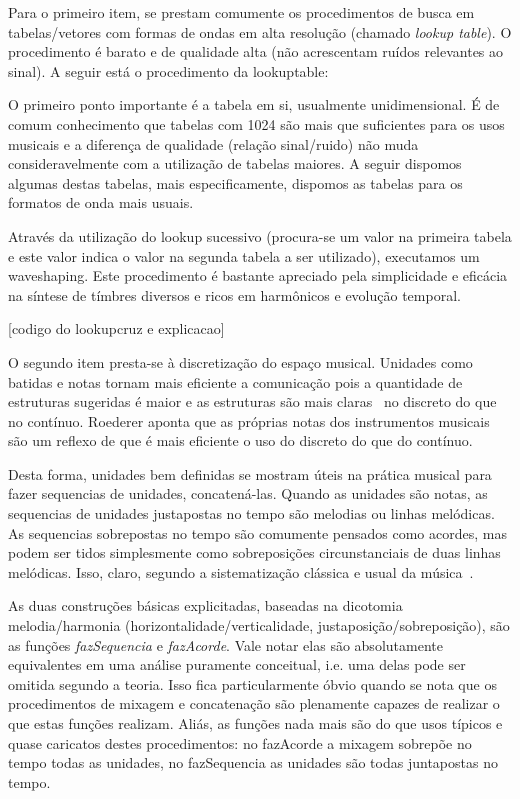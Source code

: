 Para o primeiro item, se prestam comumente os procedimentos de busca em tabelas/vetores com formas
de ondas em alta resolução (chamado \emph{lookup table}). O procedimento é barato e de qualidade alta
(não acrescentam ruídos relevantes ao sinal). A seguir está o procedimento da lookuptable:


O primeiro ponto importante é a tabela em si, usualmente unidimensional. É de comum conhecimento que
tabelas com 1024 são mais que suficientes para os usos musicais e a diferença
de qualidade (relação sinal/ruido) não muda consideravelmente com a utilização
de tabelas maiores. A seguir dispomos algumas destas tabelas, mais 
especificamente, dispomos as tabelas para os formatos de onda mais usuais. 


Através da utilização do lookup sucessivo (procura-se um valor na primeira tabela
e este valor indica o valor na segunda tabela a ser utilizado), executamos
um waveshaping. Este procedimento é bastante apreciado pela simplicidade e eficácia
na síntese de tímbres diversos e ricos em harmônicos e evolução temporal.

[codigo do lookupcruz e explicacao]

O segundo item presta-se à discretização do espaço musical. Unidades como batidas e notas
tornam mais eficiente a comunicação pois a quantidade
de estruturas sugeridas é maior e as estruturas são mais claras~\cite{Roederer} no discreto do que no contínuo. Roederer
aponta que as próprias notas dos instrumentos musicais são um reflexo de que é mais eficiente
o uso do discreto do que do contínuo.

Desta forma, unidades bem definidas se mostram úteis na prática musical 
para fazer sequencias de unidades, concatená-las. Quando as unidades
são notas, as sequencias de unidades justapostas no tempo são melodias ou linhas melódicas. As
sequencias sobrepostas no tempo são comumente pensados como acordes, mas podem ser tidos simplesmente
como sobreposições circunstanciais de duas linhas melódicas. Isso, claro, segundo
a sistematização clássica e usual da música~\cite{Lacerda}.

As duas construções básicas explicitadas, baseadas na dicotomia melodia/harmonia
(horizontalidade/verticalidade, justaposição/sobreposição), são
as funções \emph{fazSequencia} e \emph{fazAcorde}. Vale notar elas são absolutamente 
equivalentes em uma análise puramente conceitual, i.e. uma delas pode ser omitida segundo
a teoria. Isso fica particularmente óbvio quando se nota que os procedimentos de mixagem e concatenação são
plenamente capazes de realizar o que estas funções realizam. Aliás, as funções nada
mais são do que usos típicos e quase caricatos destes procedimentos: no fazAcorde a mixagem
sobrepõe no tempo todas as unidades, no fazSequencia as unidades são todas juntapostas no tempo.


